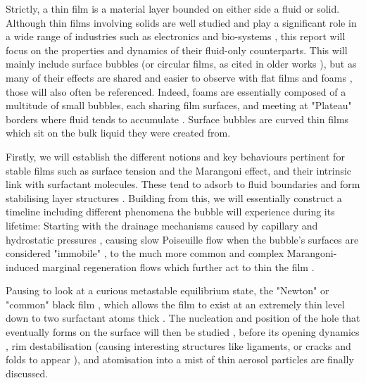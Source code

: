\documentclass[a4paper,12pt]{article}
\numberwithin{equation}{section}
\numberwithin{figure}{section}
\numberwithin{table}{section}
\begin{document}
Strictly, a thin film is a material layer bounded on either side a fluid or solid. Although thin films involving solids are well studied and play a significant role in a wide range of industries such as electronics and bio-systems \cite{SolidThinFilms}, this report will focus on the properties and dynamics of their fluid-only counterparts. This will mainly include surface bubbles (or circular films, as cited in older works \cite{Vrij1968, VrijDiscussion1966}), but as many of their effects are shared and easier to observe with flat films and foams \cite{Braun2002}, those will also often be referenced. Indeed, foams are essentially composed of a multitude of small bubbles, each sharing film surfaces, and meeting at "Plateau" borders where fluid tends to accumulate \cite{Almgren1976}. Surface bubbles are curved thin films which sit on the bulk liquid they were created from. %

Firstly, we will establish the different notions and key behaviours pertinent for stable films such as surface tension and the Marangoni effect, and their intrinsic link with surfactant molecules. These tend to adsorb to fluid boundaries \cite{Gast1997} and form stabilising layer structures \cite{Mysels1968Nomenclature}. Building from this, we will essentially construct a timeline including different phenomena the bubble will experience during its lifetime: Starting with the drainage mechanisms caused by capillary and hydrostatic pressures \cite{Lhuissier2011}, causing slow Poiseuille flow when the bubble's surfaces are considered "immobile" \cite{Nierstrasz1999, Bruinsma1995, Modini2013}, to the much more common and complex Marangoni-induced marginal regeneration flows which further act to thin the film \cite{Mysels1959Book, Bhamla2017, Bruinsma1995}.

Pausing to look at a curious metastable equilibrium state, the "Newton" or "common" black film \cite{Seung2006}, which allows the film to exist at an extremely thin level down to two surfactant atoms thick \cite{Casteletto2003}. The nucleation and position of the hole that eventually forms on the surface will then be studied \cite{ChampougnyNotBare2016, Debregeas1998}, before its opening dynamics \cite{Culick1960}, rim destabilisation (causing interesting structures like ligaments, or cracks and folds to appear \cite{Bico2015, Lhuissier2009}), and atomisation into a mist of thin aerosol particles \cite{Modini2013} are finally discussed.
\end{document}
